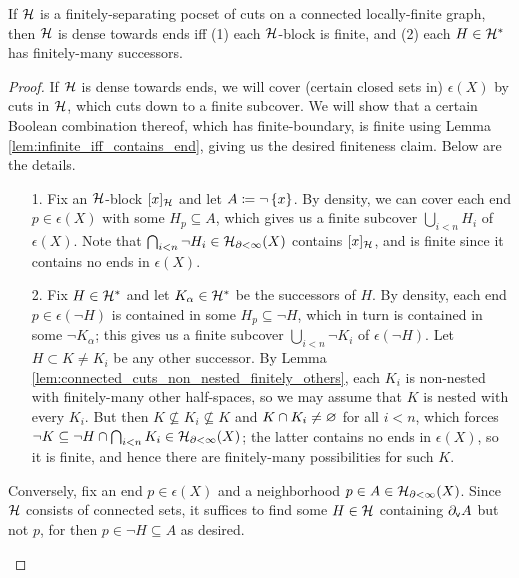 \documentclass[reqno]{amsart}
\begin{document}
    \begin{proposition}\label{prp:dense_cuts_iff_proper_walling}
        If $\mc{H}$ is a finitely-separating pocset of cuts on a connected locally-finite graph, then $\mc{H}$ is dense towards ends iff (1) each $\mc{H}$-block is finite, and (2) each $H\in\mc{H}^\ast$ has finitely-many successors.
    \end{proposition}
    \begin{proof}
        If $\mc{H}$ is dense towards ends, we will cover (certain closed sets in) $\epsilon(X)$ by cuts in $\mc{H}$, which cuts down to a finite subcover. We will show that a certain Boolean combination thereof, which has finite-boundary, is finite using Lemma \ref{lem:infinite_iff_contains_end}, giving us the desired finiteness claim. Below are the details.
        \begin{enumerate}
            \item[1.] Fix an $\mc{H}$-block $[x]_\mc{H}$ and let $A\coloneqq\lnot\l\{x\r\}$. By density, we can cover each end $p\in\epsilon(X)$ with some $H_p\subseteq A$, which gives us a finite subcover $\bigcup_{i<n}H_i$ of $\epsilon(X)$. Note that $\bigcap_{i<n}\lnot H_i\in\mc{H}_{\del<\infty}(X)$ contains $[x]_\mc{H}$, and is finite since it contains no ends in $\epsilon(X)$.
            \item[2.] Fix $H\in\mc{H}^\ast$ and let $K_\alpha\in\mc{H}^\ast$ be the successors of $H$. By density, each end $p\in\epsilon(\lnot H)$ is contained in some $H_p\subseteq\lnot H$, which in turn is contained in some $\lnot K_\alpha$; this gives us a finite subcover $\bigcup_{i<n}\lnot K_i$ of $\epsilon(\lnot H)$. Let $H\subset K\neq K_i$ be any other successor. By Lemma \ref{lem:connected_cuts_non_nested_finitely_others}, each $K_i$ is non-nested with finitely-many other half-spaces, so we may assume that $K$ is nested with every $K_i$. But then $K\not\subseteq K_i\not\subseteq K$ and $K\cap K_i\neq\em$ for all $i<n$, which forces $\lnot K\subseteq\lnot H\cap\bigcap_{i<n}K_i\in\mc{H}_{\del<\infty}(X)$; the latter contains no ends in $\epsilon(X)$, so it is finite, and hence there are finitely-many possibilities for such $K$.
        \end{enumerate}
        Conversely, fix an end $p\in\epsilon(X)$ and a neighborhood $p\in A\in\mc{H}_{\del<\infty}(X)$. Since $\mc{H}$ consists of connected sets, it suffices to find some $H\in\mc{H}$ containing $\del_\mathsf{v}A$ but not $p$, for then $p\in\lnot H\subseteq A$ as desired.
        \begin{center}
            \begin{minipage}{0.95\textwidth}

\end{minipage}
\end{center}
\end{proof}
\end{document}

